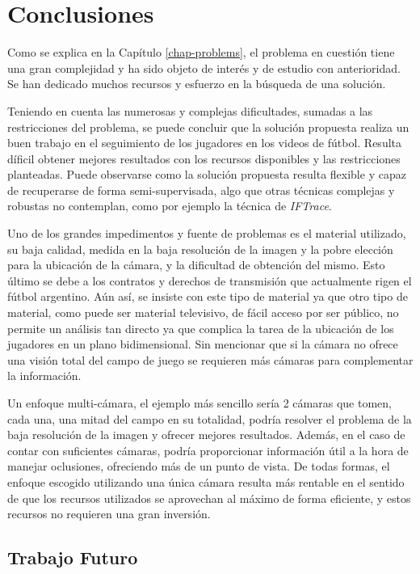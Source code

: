 \chapter{Conclusiones}
\label{chap-conclusion}

Como se explica en la Capítulo \ref{chap-problems}, el problema en cuestión
tiene una gran complejidad y ha sido objeto de interés y de estudio con
anterioridad. Se han dedicado muchos recursos y esfuerzo en la búsqueda de una
solución.

Teniendo en cuenta las numerosas y complejas dificultades, sumadas a las
restricciones del problema, se puede concluir que la solución propuesta 
realiza un buen trabajo en el seguimiento de los jugadores en los
videos de fútbol. Resulta díficil obtener mejores resultados con los recursos
disponibles y las restricciones planteadas. Puede observarse como la solución
propuesta resulta flexible y capaz de recuperarse de forma semi-supervisada,
algo que otras técnicas complejas y robustas no contemplan, como por ejemplo la
técnica de \textit{IFTrace}.

Uno de los grandes impedimentos y fuente de problemas es el material utilizado,
su baja calidad, medida en la baja resolución de la imagen y la pobre elección
para la ubicación de la cámara, y la dificultad de obtención del mismo. Esto
último se debe a los contratos y derechos de transmisión que actualmente rigen
el fútbol argentino. Aún así, se insiste con este tipo de material ya que otro
tipo de material, como puede ser material televisivo, de fácil acceso por ser
público, no permite un análisis tan directo ya que complica la tarea de la
ubicación de los jugadores en un plano bidimensional. Sin mencionar que si la
cámara no ofrece una visión total del campo de juego se requieren más cámaras
para complementar la información.

Un enfoque multi-cámara, el ejemplo más sencillo sería 2 cámaras que tomen,
cada una, una mitad del campo en su totalidad, podría resolver el problema de
la baja resolución de la imagen y ofrecer mejores resultados. Además, en el
caso de contar con suficientes cámaras, podría proporcionar información útil a
la hora de manejar oclusiones, ofreciendo más de un punto de vista. De todas
formas, el enfoque escogido utilizando una única cámara resulta más rentable
en el sentido de que los recursos utilizados se aprovechan al máximo de forma
eficiente, y estos recursos no requieren una gran inversión.

\section{Trabajo Futuro}

